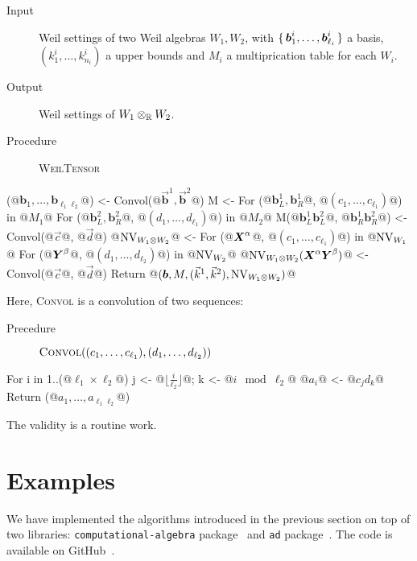 \documentclass[%
  sigconf,authorversion,screen]{acmart}
\begin{document}
\begin{algorithm}[WeilTensor]\label{alg:weil-tensor}
\hfill\vspace{-.25em}
\begin{description}
  \item[Input] Weil settings of two Weil algebras $W_1, W_2$,
  with $\set{\boldsymbol{b}_1^i, \dots, \boldsymbol{b}_{\ell_i}^i}$ a basis,
  $(k^i_1, \dots, k^i_{n_i})$ a upper bounds and $M_i$ a multiprication table for each $W_i$.
  \item[Output] Weil settings of $W_1 \otimes_{\mathbb{R}} W_2$.
  \item[Procedure] {\upshape \textsc{WeilTensor}}
\end{description}
\begin{alg}
(@$\boldsymbol{b}_1, \dots, \boldsymbol{b}_{\ell_1 \ell_2}$@) <- Convol(@$\vec{\boldsymbol{b}}^1, \vec{\boldsymbol{b}}^2$@)
M <- {}
For ({@$\boldsymbol{b}^1_L, \boldsymbol{b}^1_R$@}, @$(c_1,\dots,c_{\ell_1})$@) in @$M_1$@
  For ({@$\boldsymbol{b}^2_L, \boldsymbol{b}^2_R$@}, @$(d_1,\dots,d_{\ell_1})$@) in @$M_2$@
    M({@$\boldsymbol{b}^1_L \boldsymbol{b}^2_L$@, @$\boldsymbol{b}^1_R \boldsymbol{b}^2_R$@}) <- Convol(@$\vec{c}$@, @$\vec{d}$@)
@$\operatorname{NV}_{W_1 \otimes W_2}$@ <- {}
For (@$\boldsymbol{X}^\alpha$@, @$(c_1, \dots, c_{\ell_1})$@) in @$\operatorname{NV}_{W_1}$@
  For (@$\boldsymbol{Y}^\beta$@, @$(d_1,\dots,d_{\ell_2})$@) in @$\operatorname{NV}_{W_2}$@
    @$\operatorname{NV}_{W_1 \otimes W_2}(\boldsymbol{X}^\alpha\boldsymbol{Y}^\beta)$@ <- Convol(@$\vec{c}$@, @$\vec{d}$@)
Return @$(\boldsymbol{b}, M, (\vec{k}^1, \vec{k}^2), \operatorname{NV}_{W_1 \otimes W_2})$@
\end{alg}

Here, {\upshape \textsc{Convol}} is a convolution of two sequences:
\begin{description}
  \item[Precedure] $\mathop{\text{\upshape\scshape Convol}}((c_1, \dots, c_{\ell_1}), (d_1, \dots, d_{\ell_2}))$
\end{description}
\begin{alg}
For i in 1..(@$\ell_1 \times \ell_2$@)
  j <- @$\lfloor \frac{i}{\ell_2} \rfloor$@; k <- @$i \mod{\ell_2}$@
  @$a_i$@ <- @$c_j d_k$@
Return (@$a_1, \dots, a_{\ell_1 \ell_2}$@)
\end{alg}
\end{algorithm}

The validity is a routine work.

\section{Examples}\label{sec:examples}
We have implemented the algorithms introduced in the previous section on top of two libraries: \texttt{computational-algebra} package~\cite{ISHII:2018ek,computational-algebra} and \texttt{ad} package~\cite{Kmett:2010aa}.
The code is available on GitHub~\cite{Ishii:2020aa}.
\end{document}
